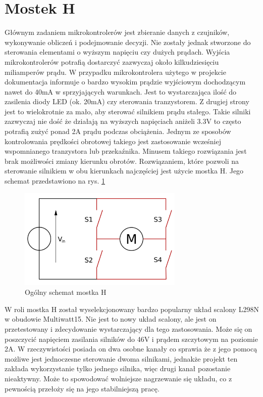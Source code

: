         \section{Mostek H}
            Głównym zadaniem mikrokontrolerów jest zbieranie danych z czujników, wykonywanie obliczeń i podejmowanie decyzji. Nie zostały jednak stworzone do sterowania elementami o wyższym napięciu czy dużych prądach. Wyjścia mikrokontrolerów potrafią dostarczyć zazwyczaj około kilkudziesięciu miliamperów prądu. W przypadku mikrokontrolera użytego w projekcie dokumentacja \cite{esp32} informuje o bardzo wysokim prądzie wyjściowym dochodzącym nawet do 40mA w sprzyjających warunkach. Jest to wystarczająca ilość do zasilenia diody LED (ok. 20mA) czy sterowania tranzystorem. Z drugiej strony jest to wielokrotnie za mało, aby sterować silnikiem prądu stałego. Takie silniki zazwyczaj nie dość że działają na wyższych napięciach aniżeli 3.3V to często potrafią zużyć ponad 2A prądu podczas obciążenia. Jednym ze sposobów kontrolowania prędkości obrotowej takiego jest zastosowanie wcześniej wspomnianego tranzystora lub przekaźnika. Minusem takiego rozwiązania jest brak możliwości zmiany kierunku obrotów. Rozwiązaniem, które pozwoli na sterowanie silnikiem w obu kierunkach najczęściej jest użycie mostka H. Jego schemat przedstawiono na rys. \ref{fig:h_bridge_schematic}
            
            \begin{figure}[ht]
                \centering
                \includegraphics[width=0.7\textwidth]{img/h_bridge_schametic.png}
                \caption{Ogólny schemat mostka H}
                \label{fig:h_bridge_schematic}
            \end{figure}
            
            W roli mostka H został wyselekcjonowany bardzo popularny układ scalony L298N w obudowie Multiwatt15. Nie jest to nowy układ scalony, ale jest on przetestowany i zdecydowanie wystarczający dla tego zastosowania. Może się on poszczycić napięciem zasilania silników do 46V i prądem szczytowym na poziomie 2A. W rzeczywistości posiada on dwa osobne kanały co sprawia że z jego pomocą możliwe jest jednoczesne sterowanie dwoma silnikami, jednakże projekt ten zakłada wykorzystanie tylko jednego silnika, więc drugi kanał pozostanie nieaktywny. Może to spowodować wolniejsze nagrzewanie się układu, co z pewnością przełoży się na jego stabilniejszą pracę. 
            
